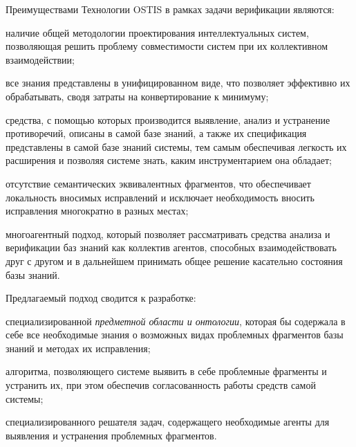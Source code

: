 Преимуществами Технологии OSTIS в рамках задачи верификации являются:
\begin{textitemize}
    \item наличие общей методологии проектирования интеллектуальных систем, позволяющая решить проблему совместимости систем при их коллективном взаимодействии;
    \item все знания представлены в унифицированном виде, что позволяет эффективно их обрабатывать, сводя затраты на конвертирование к минимуму;
   \item средства, с помощью которых производится выявление, анализ и устранение противоречий, описаны в самой базе знаний, а также их спецификация представлены в самой базе знаний системы, тем самым обеспечивая легкость их расширения и позволяя системе знать, каким инструментарием она обладает;
   \item отсутствие семантических эквивалентных фрагментов, что обеспечивает локальность вносимых исправлений и исключает необходимость вносить исправления многократно в разных местах;
   \item многоагентный подход, который позволяет рассматривать средства анализа и верификации баз знаний как коллектив агентов, способных взаимодействовать друг с другом и в дальнейшем принимать общее решение касательно состояния базы знаний. 
\end{textitemize}

Предлагаемый подход сводится к разработке:
\begin{textitemize}
    \item специализированной \textit{предметной области и онтологии}, которая бы содержала в себе все необходимые знания о возможных видах проблемных фрагментов базы знаний и методах их исправления;
    \item алгоритма, позволяющего системе выявить в себе проблемные фрагменты и устранить их, при этом обеспечив согласованность работы средств самой системы;
    \item специализированного решателя задач, содержащего необходимые агенты для выявления и устранения проблемных фрагментов.
\end{textitemize}

